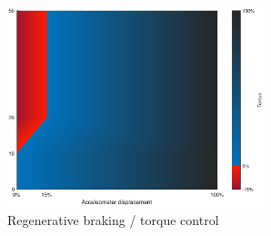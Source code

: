 \begin{figure}[h]
    \centering
        \includegraphics[height=5.8cm]{figures/regen_ideal}
        \caption{Regenerative braking / torque control}
        \label{regen_ideal}
\end{figure}




